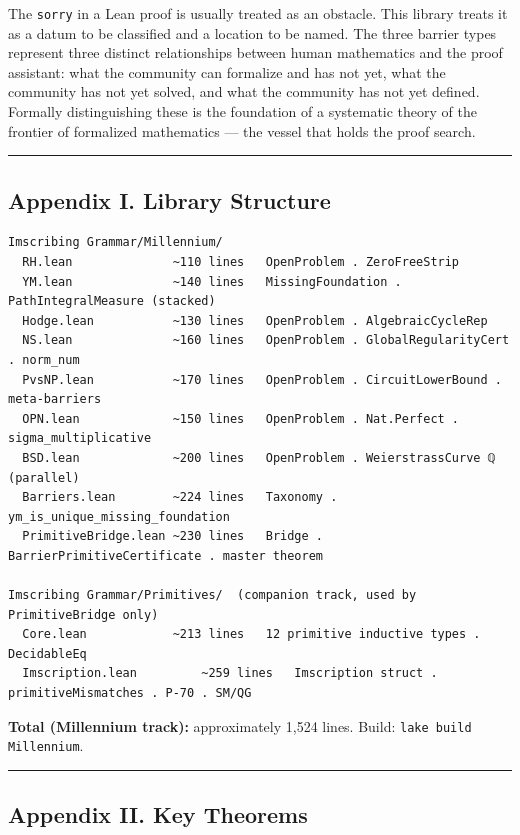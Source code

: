 \documentclass[12pt,a4paper]{article}
\begin{document}
The \texttt{sorry} in a Lean proof is usually treated as an obstacle. This library treats it as a datum to be classified and a location to be named. The three barrier types represent three distinct relationships between human mathematics and the proof assistant: what the community can formalize and has not yet, what the community has not yet solved, and what the community has not yet defined. Formally distinguishing these is the foundation of a systematic theory of the frontier of formalized mathematics --- the vessel that holds the proof search.

\begin{center}
\rule{0.5\textwidth}{0.4pt}
\end{center}

\subsection{Appendix I. Library Structure}

\begin{lstlisting}
Imscribing Grammar/Millennium/
  RH.lean              ~110 lines   OpenProblem . ZeroFreeStrip
  YM.lean              ~140 lines   MissingFoundation . PathIntegralMeasure (stacked)
  Hodge.lean           ~130 lines   OpenProblem . AlgebraicCycleRep
  NS.lean              ~160 lines   OpenProblem . GlobalRegularityCert . norm_num
  PvsNP.lean           ~170 lines   OpenProblem . CircuitLowerBound . meta-barriers
  OPN.lean             ~150 lines   OpenProblem . Nat.Perfect . sigma_multiplicative
  BSD.lean             ~200 lines   OpenProblem . WeierstrassCurve ℚ (parallel)
  Barriers.lean        ~224 lines   Taxonomy . ym_is_unique_missing_foundation
  PrimitiveBridge.lean ~230 lines   Bridge . BarrierPrimitiveCertificate . master theorem

Imscribing Grammar/Primitives/  (companion track, used by PrimitiveBridge only)
  Core.lean            ~213 lines   12 primitive inductive types . DecidableEq
  Imscription.lean         ~259 lines   Imscription struct . primitiveMismatches . P-70 . SM/QG
\end{lstlisting}

\textbf{Total (Millennium track):} approximately 1,524 lines. Build: \texttt{lake build Millennium}.

\begin{center}
\rule{0.5\textwidth}{0.4pt}
\end{center}

\subsection{Appendix II. Key Theorems}
\end{document}
